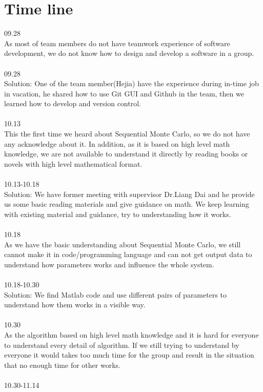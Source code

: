\documentclass[11pt,oneside,a4paper]{article}
\begin{document}
\section{Time line}
09.28\\
As most of team members do not have teamwork experience of software development, we do not know how to design and develop a software in a group.
\\\\
09.28\\
Solution: One of the team member(Hejia) have the experience during in-time job in vacation, he shared how to use Git GUI and Github in the team, then we learned how to develop and version control.
\\\\
10.13\\
This the first time we heard about Sequential Monte Carlo, so we do not have any acknowledge about it. In addition, as it is based on high level math knowledge, we are not available to understand it directly by reading books or novels with high level mathematical format.
\\\\
10.13-10.18\\
Solution: We have former meeting with supervisor Dr.Liang Dai and he provide us some basic reading materials and give guidance on math. We keep learning with existing material and guidance, try to understanding how it works.
\\\\
10.18\\
As we have the basic understanding about Sequential Monte Carlo, we still cannot make it in code/programming language and can not get output data to understand how parameters works and influence the whole system.
\\\\
10.18-10.30\\
Solution: We find Matlab code and use different pairs of parameters to understand how them works in a visible way.
\\\\
10.30\\
As the algorithm based on high level math knowledge and it is hard for everyone to understand every detail of algorithm. If we still trying to understand by everyone it would takes too much time for the group and result in the situation that no enough time for other works.
\\\\
10.30-11.14\\
\end{document}
